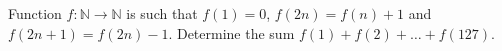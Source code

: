 \problem
Function $f: \mathbb{N} \to \mathbb{N}$ is such that
$f(1) = 0$, $f(2 n) = f(n) + 1$ and $f(2 n + 1) = f(2 n) - 1$.
Determine the sum $f(1) + f(2) + \ldots + f(127)$.
\solution
\endproblem
